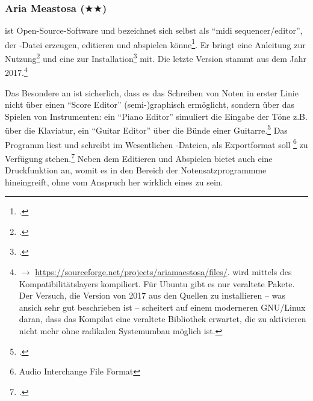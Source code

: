%
%
%



\subsubsection{Aria Meastosa ($\bigstar$$\bigstar$)}

\label{AriaMaestosa} ist Open-Source-Software und bezeichnet
sich selbst als  \enquote{midi sequencer/editor}, der -Datei erzeugen,
editieren und abspielen könne\footcite[vgl.][\nopage wp]{AriaMaestosa2017a}. Er
bringt eine Anleitung zur Nutzung\footcite[vgl.][\nopage wp]{AriaMaestosa2017b}
und eine zur Installation\footcite[vgl.][\nopage wp]{AriaMaestosa2017c} mit. Die
letzte Version stammt aus dem Jahr 2017.\footnote{$\rightarrow$
\href{https://sourceforge.net/projects/ariamaestosa/files/}
{https://sourceforge.net/projects/ariamaestosa/files/}.  wird
mittels des Kompatibilitätslayers  kompiliert. Für Ubuntu gibt es
nur veraltete Pakete. Der Versuch, die Version von 2017 aus den Quellen zu
installieren -- was ansich sehr gut beschrieben ist -- scheitert auf einem
mo\-der\-ne\-ren GNU/Linux daran, dass das Kompilat eine veraltete Bibliothek
erwartet, die zu aktivieren nicht mehr ohne radikalen Systemumbau möglich ist.}

Das Besondere an  ist sicherlich, dass es das Schreiben von
Noten in erster Linie nicht über einen \enquote{Score Editor} (semi-)graphisch
ermöglicht, sondern über das Spielen von Instrumenten: ein \enquote{Piano Editor}
simuliert die Eingabe der Töne z.B. über die Klaviatur, ein \enquote{Guitar
Editor} über die Bünde einer Guitarre.\footcite[vgl.][\nopage
wp]{AriaMaestosa2017b} Das Programm liest und schreibt im Wesentlichen
-Dateien, als Exportformat soll \footnote{Audio Interchange
File Format} zu Verfügung stehen.\footcite[vgl.][\nopage wp]{Guepewi2017a} Neben
dem Editieren und Abspielen bietet  auch eine
Druckfunktion an, womit es in den Bereich der Notensatzprogrammme hineingreift,
ohne vom Anspruch her wirklich eines zu sein.

